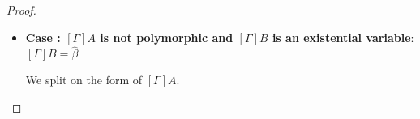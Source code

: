 \documentclass[a4paper]{article}
\makeatletter
\newcommand{\fontsz}[2]{\zzfontsz=#1{\fontsize{\zzfontsz}{1.2\zzfontsz}\selectfont{#2}}}
\newcommand{\mathsz}[2]{\text{\fontsz{#1}{$#2$}}}
\newcommand{\arr}{\rightarrow}
\def\CompactJudgments{0}
\newcommand{\entails}{\mathrel{\ifnum\CompactJudgments=1\vdash \else \vdash\,\fi}}
\newcommand{\ctxoutsym}{\ifnum\CompactJudgments=1\dashv \else \,\dashv \fi}
\newcommand{\ctxout}[1]{\mathrel{\ctxoutsym}{#1}}
\newcommand{\FV}[1]{\mathrm{FV}(#1)}
\newcommand{\subtypingycolor}[1]{\textcolor{dDigPurple}{#1}}
\newcommand{\subtype}{\mathrel{\normalfont\texttt{\subtypingycolor{<:}}}}  \newcommand{\declsubtype}{\mathrel{\leq}}
\newcommand{\Theoremref}[1]{Theorem \ref{#1}}
\newcommand{\Lemmaref}[1]{Lemma \ref{#1} (\nameref{#1})}   \newcommand{\Lemref}[1]{\Lemma \ref{#1}}   \newcommand{\Conjectureref}[1]{Conjecture \ref{#1}}
\newcommand{\BeginProof}{\renewcommand{\arraystretch}{1.1} \begin{tabular}[b]{r@{}r @{} l  l}}
\newcommand{\EndProof}{\end{tabular} \renewcommand{\arraystretch}{\mydefaultarraystretch}}
\newcommand{\Hand}{\text{\Pointinghand~~~~}}
\newcommand{\Pf}[4] {&$#1$ $#2$\, & $#3$ & #4 \\}
\newcommand{\Pfmrg}[3] {&$#1$\, & $#2$ & #3 \\}
\newcommand{\mkpf}[4] {\Pf{#2}{#1\,}{#3}{#4}}
\newcommand{\eqPf}[3] {\mkpf{=}{#1}{#2}{#3}}
\newcommand{\neqPf}[3] {\mkpf{\neq}{#1}{#2}{#3}}
\newcommand{\contraPf}[1] {\Pf{\Rightarrow\Leftarrow}{}{} {}\Pf{#1}{}{} {By contradiction}}
\newcommand{\proofsep}{\,\\[-0.5em]}
\newenvironment{llproof}{\BeginProof}{\EndProof}
\newcommand{\ditto}{\ensuremath{''}}
\newcommand{\instsymLeq}{\settowidth{\zzinstsymLTwidth}{\text{\normalfont\tt<}}\settowidth{\zzinstsymEQwidth}{\text{\normalfont=}}\setlength{\zzinstsymDiff}{\zzinstsymEQwidth}\addtolength{\zzinstsymDiff}{-\zzinstsymLTwidth}\text{\raisebox{-0.22ex}{\normalfont=}\hspace{-\zzinstsymEQwidth}\hspace{0.5\zzinstsymDiff}\raisebox{0.77ex}{\normalfont\tt<}}}
\newcommand{\instsymColon}{\raisebox{-0.09ex}{\text{\normalfont{:}}}}
\newcommand{\instsyml}{\subtypingycolor{\instsymColon\hspace{0.05ex}\instsymLeq}}
\newcommand{\declsubjudgPf}[4] {\Pf{#1}{\entails}{{#2} \declsubtype {#3}}{#4}}
\newcommand{\subjudgPf}[5] {\Pf{#1}{\entails}{{#2} \subtype {#3} \ctxout{#4}}{#5}}
\newcommand{\substextendPf}[3] {\Pfmrg{{#1} \extendssym\,}{#2}{#3}}
\newcommand{\instjudgPf}[5]{\Pf{#1}{\entails}{{#2} {\;\instsyml\;} {#3} \ctxout{#4}}{#5}}
\newcommand{\extendssym}{\longrightarrow}
\newcommand{\ahat}{\hat{\alpha}}
\newcommand{\bhat}{\hat{\beta}}
\newcommand{\rulename}[1]{\text{\normalfont\textsf{#1}}}
\newcommand{\Subrulename}[1]{\ensuremath{{\subtype}\rulename{#1}}\xspace}
\newcommand{\SubInst}[1]{\Subrulename{Instantiate{#1}}}
\newcommand{\SubInstL}{\SubInst{L}}
\newcommand{\subtermofsym}{\preceq}
\newcommand{\subtermof}{\mathrel{\subtermofsym}}
\newcommand{\propersubtermofsym}{\prec}
\newcommand{\propersubtermof}{\mathrel{\propersubtermofsym}}
\newcommand{\subtermofPf}[3] {\mkpf{\subtermof}{#1}{#2}{#3}}
\newcommand{\propersubtermofPf}[3] {\mkpf{\propersubtermof}{#1}{#2}{#3}}
\newcommand{\occursinsidearrow}{{\hspace{0.6ex}\raisebox{-0.4ex}{\ensuremath{\propersubtermof\rput[b](-1.35ex,1.2ex){\ensuremath{\mathsz{1.4ex}{\arr}}}}}}}
\newcommand{\notoccursinsidearrow}{{\hspace{0.6ex}\raisebox{-0.4ex}{\ensuremath{\propersubtermof{\rput[b](-2.3ex,0.0ex){\ensuremath{\not}}}\rput[b](-1.35ex,1.2ex){\ensuremath{\mathsz{1.4ex}{\arr}}}}}}}
\newcommand{\occursinsidearrowPf}[3] {\mkpf{\!\occursinsidearrow\!}{#1}{#2}{#3}}
\newcommand{\notoccursinsidearrowPf}[3] {\mkpf{\!\notoccursinsidearrow\!}{#1}{#2}{#3}}
\makeatother
\begin{document}
\begin{proof}
\begin{itemize}
\begin{itemize}
\begin{itemize}
                       \begin{llproof}
                         \subtermofPf {\ahat} {[\Gamma]B}   {$\ahat \in \FV{[\Gamma]B}$}
                         \subtermofPf {[\Omega]\ahat} {[\Omega][\Gamma]B}   {By a property of substitution}
                         \proofsep
                         \substextendPf {\Gamma}{\Omega}   {Given}
                         \eqPf {[\Omega][\Gamma]B} {[\Omega]B}   {By \Lemmaref{lem:subst-extension-invariance}}
                         \proofsep
                         \subtermofPf {[\Omega]\ahat} {[\Omega]B}   {By above equality}
                         \proofsep
                         \neqPf {[\Gamma]B} {\ahat}      {Given (2.AEx.Arrow)}
                         \neqPf {[\Omega][\Gamma]B} {[\Omega]\ahat}      {By a property of substitution}
                         \neqPf {[\Omega]B} {[\Omega]\ahat}      {By \Lemmaref{lem:subst-extension-invariance}}
                         \proofsep
                         \propersubtermofPf {[\Omega]\ahat} {[\Omega]B}   {Follows from $\subtermofsym$ and $\neq$}
                         \occursinsidearrowPf {[\Omega]\ahat} {[\Omega]B}   {$[\Omega]A$ has the form $\cdots \arr \cdots$}
                         \declsubjudgPf{[\Omega]\Gamma} {[\Omega]\ahat} {[\Omega]B}   {Given}
                         \Pf{}{}{[\Omega]B\text{~is a monotype}}  {$\Omega$ is predicative}
                         \notoccursinsidearrowPf {[\Omega]\ahat} {[\Omega]B}   {By \Lemmaref{lem:occurrence} (ii)}
                       \contraPf{\ahat \notin \FV{[\Gamma]B}}
                      \end{llproof}

                   \begin{llproof}
                     \instjudgPf{\Gamma} {\ahat} {[\Gamma]B} {\Delta}   {By \Theoremref{thm:instantiation-completes} (1)}
\Hand             \substextendPf{\Delta} {\Omega'}   {\ditto}
\Hand             \substextendPf{\Omega} {\Omega'}   {\ditto}
\Hand             \subjudgPf{\Gamma} {\ahat} {\underbrace{[\Gamma]B}_{B_1 \arr B_2}} {\Delta}   {By \SubInstL}
                   \end{llproof}
    \end{itemize}



    \item \textbf{Case : $[\Gamma]A$ is not polymorphic and $[\Gamma]B$ is an existential variable}:
         $[\Gamma]B = \bhat$

         We split on the form of $[\Gamma]A$.


\end{itemize}
\end{itemize}
\end{proof}
\end{document}
